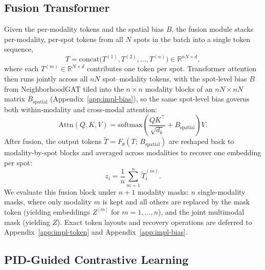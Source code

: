 \documentclass{article}
\theoremstyle{plain}
\theoremstyle{definition}
\begin{document}
\subsection{Fusion Transformer}
\label{subsec:fusion-transformer}

Given the per-modality tokens and the spatial bias $B$, the fusion module stacks per-modality, per-spot tokens from all $N$ spots in the batch into a single token sequence,
\begin{equation}
  T = \mathrm{concat}\bigl(T^{(1)}, T^{(2)}, \ldots, T^{(n)}\bigr) \in \mathbb{R}^{nN \times d},
\end{equation}
where each $T^{(m)} \in \mathbb{R}^{N \times d}$ contributes one token per spot. Transformer attention~\cite{vaswani2017attention} then runs jointly across all $nN$ spot--modality tokens, with the spot-level bias $B$ from NeighborhoodGAT tiled into the $n \times n$ modality blocks of an $nN \times nN$ matrix $B_{\mathrm{spatial}}$ (Appendix~\ref{app:impl-bias}), so the same spot-level bias governs both within-modality and cross-modal attention:
\begin{equation}
  \mathrm{Attn}(Q,K,V)
  = \mathrm{softmax}\!\left(
    \frac{QK^\top}{\sqrt{d_k}} + B_{\mathrm{spatial}}
  \right)V.
\end{equation}
After fusion, the output tokens $\tilde T = F_\theta(T;\,B_{\mathrm{spatial}})$ are reshaped back to modality-by-spot blocks and averaged across modalities to recover one embedding per spot:
\begin{equation}
  z_i = \frac{1}{n}\sum_{m=1}^{n} \tilde T^{(m)}_i.
\end{equation}
We evaluate this fusion block under $n + 1$ modality masks: $n$ single-modality masks, where only modality $m$ is kept and all others are replaced by the mask token (yielding embeddings $Z^{[m]}$ for $m = 1, \ldots, n$), and the joint multimodal mask (yielding $Z$). Exact token layouts and recovery operations are deferred to Appendix~\ref{app:impl-token} and Appendix~\ref{app:impl-bias}.

\subsection{PID-Guided Contrastive Learning}
\label{subsec:pid-contrastive}
\end{document}
